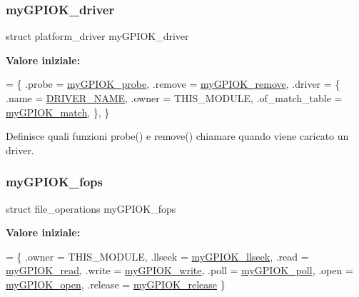 \subsubsection{\texorpdfstring{my\+G\+P\+I\+O\+K\+\_\+driver}{myGPIOK\_driver}}
{\footnotesize\ttfamily struct platform\+\_\+driver my\+G\+P\+I\+O\+K\+\_\+driver\hspace{0.3cm}{\ttfamily [static]}}

{\bfseries Valore iniziale\+:}
\begin{DoxyCode}
= \{
        .probe = \hyperlink{group___linux-_driver_gae40973a06d72f7c41a9af07513a62307}{myGPIOK\_probe},
        .remove = \hyperlink{group___linux-_driver_ga59fddfaa36dea357f4bbdfceb0f47f8c}{myGPIOK\_remove},
        .driver = \{
                .name = \hyperlink{group___linux-_driver_ga25634d21648ca7fb7a2aca614bafaaeb}{DRIVER\_NAME},
                .owner = THIS\_MODULE,
                .of\_match\_table = \hyperlink{group___linux-_driver_gab59f49dc0fe8d885c73752b8a8163d0e}{myGPIOK\_match},
        \},
\}
\end{DoxyCode}


Definisce quali funzioni probe() e remove() chiamare quando viene caricato un driver. 

\mbox{\label{group___linux-_driver_gad1963bc01fffdbb315a408a9210cbafc}} 
\subsubsection{\texorpdfstring{my\+G\+P\+I\+O\+K\+\_\+fops}{myGPIOK\_fops}}
{\footnotesize\ttfamily struct file\+\_\+operations my\+G\+P\+I\+O\+K\+\_\+fops\hspace{0.3cm}{\ttfamily [static]}}

{\bfseries Valore iniziale\+:}
\begin{DoxyCode}
= \{
        .owner      = THIS\_MODULE,
        .llseek     = \hyperlink{group___linux-_driver_ga66e7f726b72320a272b633ecbaecefff}{myGPIOK\_llseek},
        .read       = \hyperlink{group___linux-_driver_ga90ac339df9c02ae5f11a2a7727adc923}{myGPIOK\_read},
        .write      = \hyperlink{group___linux-_driver_ga1eea0f6c86e8966ba9b701da57502aad}{myGPIOK\_write},
        .poll       = \hyperlink{group___linux-_driver_gaba935e8a8215c2ebce9a7147fd4f5147}{myGPIOK\_poll},
        .open       = \hyperlink{group___linux-_driver_gad013759c18fbf6ea96005b9b3bfa5b4e}{myGPIOK\_open},
        .release    = \hyperlink{group___linux-_driver_ga17ce7f574723246c790b70b06e3e7103}{myGPIOK\_release}
\}
\end{DoxyCode}


